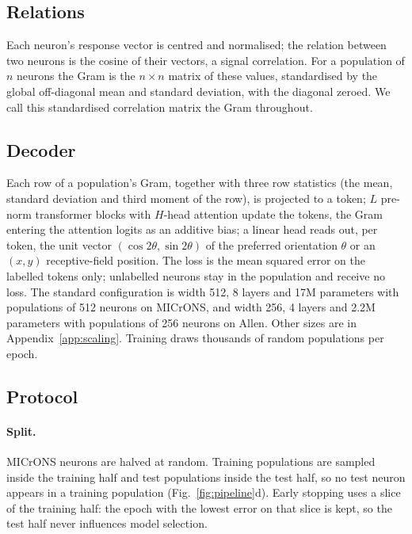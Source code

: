 \documentclass[11pt]{article}
\begin{document}
\subsection{Relations}

Each neuron's response vector is centred and normalised; the relation between two neurons is the cosine of their vectors, a signal correlation. For a population of $n$ neurons the Gram is the $n\times n$ matrix of these values, standardised by the global off-diagonal mean and standard deviation, with the diagonal zeroed. We call this standardised correlation matrix the Gram throughout.

\subsection{Decoder}

Each row of a population's Gram, together with three row statistics (the mean, standard deviation and third moment of the row), is projected to a token; $L$ pre-norm transformer blocks \citep{vaswani2017,xiong2020} with $H$-head attention update the tokens, the Gram entering the attention logits as an additive bias; a linear head reads out, per token, the unit vector $(\cos 2\theta, \sin 2\theta)$ of the preferred orientation $\theta$ or an $(x,y)$ receptive-field position. The loss is the mean squared error on the labelled tokens only; unlabelled neurons stay in the population and receive no loss. The standard configuration is width 512, 8 layers and 17M parameters with populations of 512 neurons on MICrONS, and width 256, 4 layers and 2.2M parameters with populations of 256 neurons on Allen. Other sizes are in Appendix~\ref{app:scaling}. Training draws thousands of random populations per epoch.

\subsection{Protocol}

\paragraph{Split.} MICrONS neurons are halved at random. Training populations are sampled inside the training half and test populations inside the test half, so no test neuron appears in a training population (Fig.~\ref{fig:pipeline}d). Early stopping uses a slice of the training half: the epoch with the lowest error on that slice is kept, so the test half never influences model selection.
\end{document}
